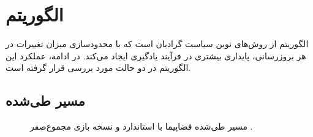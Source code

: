 \section{الگوریتم }
\label{sec:ppo_results}

الگوریتم   از روش‌های نوین سیاست گرادیان است که با محدودسازی میزان تغییرات در هر بروزرسانی، پایداری بیشتری در فرآیند یادگیری ایجاد می‌کند. در ادامه، عملکرد این الگوریتم در دو حالت مورد بررسی قرار گرفته است.

\subsection{مسیر طی‌شده}
\begin{figure}[H]
	\centering
	
	
	\caption{مسیر طی‌شده فضاپیما با  استاندارد و نسخه بازی مجموع‌صفر .}
\end{figure}

